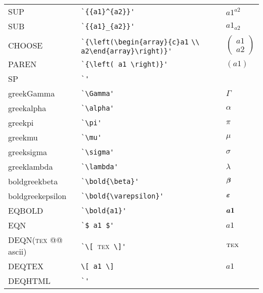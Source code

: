 \documentclass[a4paper,11pt]{article}
\newcommand{\bold}[1]{\mbox{\boldmath $#1$}}
\begin{document}
\begin{center}
\begin{tabular}{l@{\ \ $\to$\ \ }p{12em}@{\ \ $\longrightarrow$\ \ }l}
SUP             & \verb#`{{a1}^{a2}}'#  & $ {{a1}^{a2}} $ \\
SUB             & \verb#`{{a1}_{a2}}'#  & $ {{a1}_{a2}} $ \\
CHOOSE          & \footnotesize
                    \verb#`{\left(\begin{array}{c}a1# 
                        \hspace*{1em} \verb#\\ a2\end{array}\right)}'# 
                 & $ {\left(\begin{array}{c} a1 \\ a2 \end{array} \right)} $ \\
PAREN           & \verb#`{\left( a1 \right)}'#  & $ {\left( a1 \right)} $ \\
SP              & \verb#`'#     & $  $ \\
\hline
greekGamma      & \verb#`\Gamma'#       & $ \Gamma $ \\
greekalpha      & \verb#`\alpha'#       & $ \alpha $ \\
greekpi         & \verb#`\pi'#  & $ \pi $ \\
greekmu         & \verb#`\mu'#  & $ \mu $ \\
greeksigma      & \verb#`\sigma'#       & $ \sigma $ \\
greeklambda     & \verb#`\lambda'#      & $ \lambda $ \\
boldgreekbeta   & \verb#`\bold{\beta}'#         & $ \bold{\beta} $ \\
boldgreekepsilon& \verb#`\bold{\varepsilon}'#   & $ \bold{\varepsilon} $ \\
\hline\hline
EQBOLD          & \verb#`\bold{a1}'#    & $ \bold{a1} $ \\
EQN             & \verb#`$ a1 $'#       & $  a1  $ \\
DEQN(\textsc{tex} @@ ascii) & \verb#`\[ #\textsc{tex}\verb# \]'#
                                        &  $\displaystyle \textsc{tex} $  \\
DEQTEX          & \verb#\[ a1 \]#       &  $\displaystyle a1 $  \\
DEQHTML         & \verb#`'#     & $  $ \\ \hline
\end{tabular}
\end{center}

\bigskip
\end{document}
